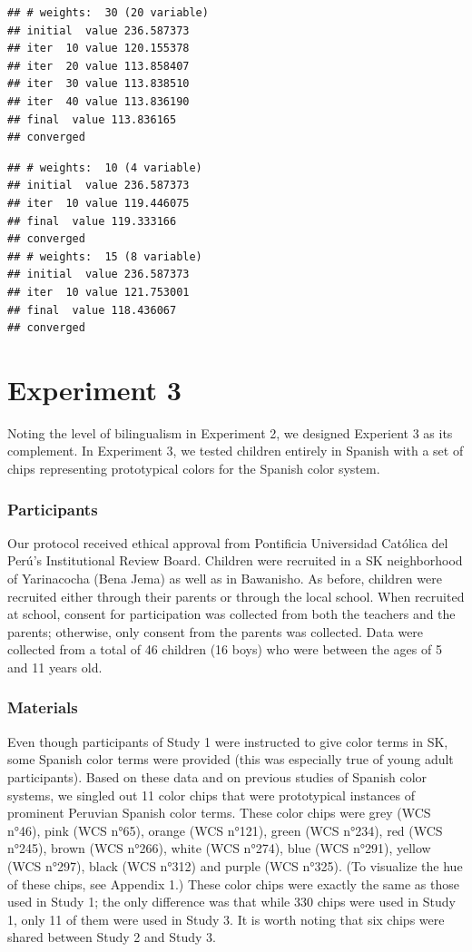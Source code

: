 \documentclass[man]{apa6}
\theoremstyle{definition}
\theoremstyle{definition}
\theoremstyle{definition}
\theoremstyle{remark}
\begin{document}
\begin{verbatim}
## # weights:  30 (20 variable)
## initial  value 236.587373 
## iter  10 value 120.155378
## iter  20 value 113.858407
## iter  30 value 113.838510
## iter  40 value 113.836190
## final  value 113.836165 
## converged
\end{verbatim}

\begin{verbatim}
## # weights:  10 (4 variable)
## initial  value 236.587373 
## iter  10 value 119.446075
## final  value 119.333166 
## converged
## # weights:  15 (8 variable)
## initial  value 236.587373 
## iter  10 value 121.753001
## final  value 118.436067 
## converged
\end{verbatim}

\section{Experiment 3}\label{experiment-3}

Noting the level of bilingualism in Experiment 2, we designed Experient
3 as its complement. In Experiment 3, we tested children entirely in
Spanish with a set of chips representing prototypical colors for the
Spanish color system.

\subsubsection{Participants}\label{participants-2}

Our protocol received ethical approval from Pontificia Universidad
Católica del Perú's Institutional Review Board. Children were recruited
in a SK neighborhood of Yarinacocha (Bena Jema) as well as in Bawanisho.
As before, children were recruited either through their parents or
through the local school. When recruited at school, consent for
participation was collected from both the teachers and the parents;
otherwise, only consent from the parents was collected. Data were
collected from a total of 46 children (16 boys) who were between the
ages of 5 and 11 years old.

\subsubsection{Materials}\label{materials-2}

Even though participants of Study 1 were instructed to give color terms
in SK, some Spanish color terms were provided (this was especially true
of young adult participants). Based on these data and on previous
studies of Spanish color systems, we singled out 11 color chips that
were prototypical instances of prominent Peruvian Spanish color terms.
These color chips were grey (WCS n°46), pink (WCS n°65), orange (WCS
n°121), green (WCS n°234), red (WCS n°245), brown (WCS n°266), white
(WCS n°274), blue (WCS n°291), yellow (WCS n°297), black (WCS n°312) and
purple (WCS n°325). (To visualize the hue of these chips, see Appendix
1.) These color chips were exactly the same as those used in Study 1;
the only difference was that while 330 chips were used in Study 1, only
11 of them were used in Study 3. It is worth noting that six chips were
shared between Study 2 and Study 3.
\end{document}
